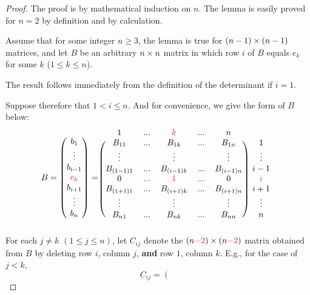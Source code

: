 \begin{proof}
The proof is by mathematical induction on \(n\).
The lemma is easily proved for \(n = 2\) by definition and by calculation.

Assume that for some integer \(n \ge 3\), the lemma is true for \((n - 1) \times (n - 1)\) matrices, and let \(B\) be an arbitrary \(n \times n\) matrix in which row \(i\) of \(B\) equals \(e_k\) for some \(k\) (\(1 \le k \le n\)).

The result follows immediately from the definition of the determinant if \(i = 1\).

Suppose therefore that \(1 < i \le n\).
And for convenience, we give the form of \(B\) below:
\begin{equation} \label{lem.4.1.structure.of.B}
    B = \begin{pmatrix} b_1 \\ \vdots \\ b_{i - 1} \\ \RED{e_k} \\ b_{i + 1} \\ \vdots \\ b_n
    \end{pmatrix}
    = \begin{blockarray}{cccccc}
        1 & ... & \RED{k} & ... & n \\
        \begin{block}{(ccccc)c}
        B_{11} & ... & B_{1k}  & ... & B_{1n} & 1 \\
        \vdots &     & \vdots  &     & \vdots & \vdots \\
        B_{(1-1)1} & ... & B_{(i-1)k}  & ... & B_{(i-1)n} & i-1 \\
        0      & ... & \RED{1} & ... & 0      & \RED{i} \\
        B_{(1+1)1} & ... & B_{(i+1)k}  & ... & B_{(i+1)n} & i+1 \\
        \vdots &     & \vdots  &     & \vdots & \vdots \\
        B_{n1} & ... & B_{nk}  & ... & B_{nn} & n \\
        \end{block}
    \end{blockarray}
\end{equation}
For each \(j \ne k\) \((1 \le j \le n)\), let \(C_{ij}\) denote the \((n \RED{ - 2}) \X (n \RED{ - 2})\) matrix obtained from \(B\) by deleting row \(i\), column \(j\), \textbf{and} row \(1\), column \(k\).
E.g., for the case of \(j < k\),
\[
    C_{ij}
    = \left(\begin{array}{cccccccccc}

\end{array}\]
\end{proof}
